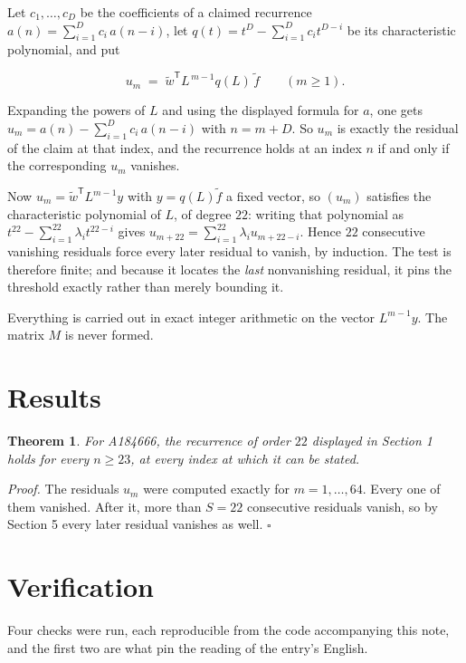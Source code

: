 \documentclass[11pt]{article}
\newtheorem{theorem}{Theorem}
\theoremstyle{definition}
\begin{document}
Let $c_1,\dots,c_D$ be the coefficients of a claimed recurrence $a(n) = \sum_{i=1}^{D} c_i\,a(n-i)$, let $q(t) = t^{D} - \sum_{i=1}^{D} c_i t^{D-i}$ be its characteristic polynomial, and put

\[u_m \;=\; \tilde w^{\mathsf T} L^{\,m-1} q(L)\,\tilde f \qquad (m \ge 1).\]

Expanding the powers of $L$ and using the displayed formula for $a$, one gets $u_m = a(n) - \sum_{i=1}^{D} c_i\,a(n-i)$ with $n = m + D$. So $u_m$ is exactly the residual of the claim at that index, and the recurrence holds at an index $n$ if and only if the corresponding $u_m$ vanishes.

Now $u_m = \tilde w^{\mathsf T} L^{m-1} y$ with $y = q(L)\tilde f$ a fixed vector, so $(u_m)$ satisfies the characteristic polynomial of $L$, of degree $22$: writing that polynomial as $t^{22} - \sum_{i=1}^{22} \lambda_i t^{22-i}$ gives $u_{m+22} = \sum_{i=1}^{22} \lambda_i u_{m+22-i}$. Hence $22$ consecutive vanishing residuals force every later residual to vanish, by induction. The test is therefore finite; and because it locates the {\itshape last} nonvanishing residual, it pins the threshold exactly rather than merely bounding it.

Everything is carried out in exact integer arithmetic on the vector $L^{m-1}y$. The matrix $M$ is never formed.

\section{Results}

\begin{theorem} For A184666, the recurrence of order $22$ displayed in Section 1 holds for every $n \ge 23$, at every index at which it can be stated.\end{theorem}

{\itshape Proof.} The residuals $u_m$ were computed exactly for $m = 1,\dots,64$. Every one of them vanished. After it, more than $S = 22$ consecutive residuals vanish, so by Section 5 every later residual vanishes as well. $\square$

\section{Verification}

Four checks were run, each reproducible from the code accompanying this note, and the first two are what pin the reading of the entry's English.
\end{document}
